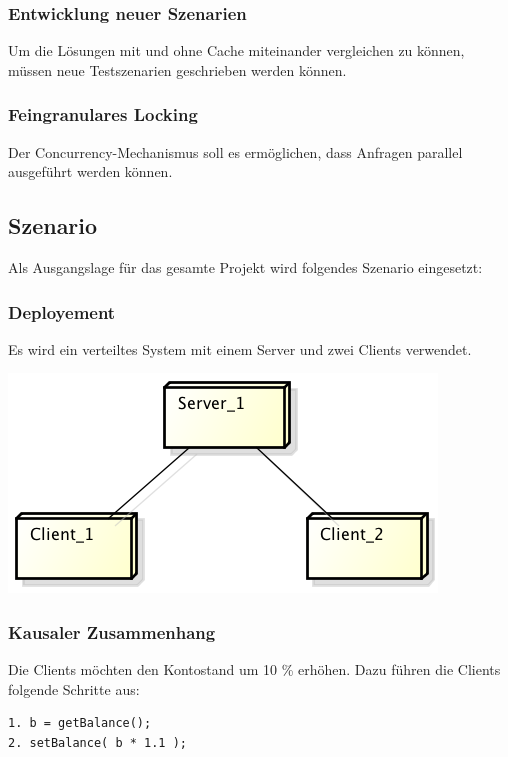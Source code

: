\documentclass{article}
\begin{document}
\subsubsection{Entwicklung neuer Szenarien}
\label{sec:entwicklung-neuer-szenarien}

Um die Lösungen mit und ohne Cache miteinander vergleichen zu können, müssen neue Testszenarien geschrieben werden können.

\subsubsection{Feingranulares Locking}
\label{sec:feingr-lock}

Der Concurrency-Mechanismus soll es ermöglichen, dass Anfragen parallel ausgeführt werden können.

\subsection{Szenario}
\label{sec:szenario}

Als Ausgangslage für das gesamte Projekt wird folgendes Szenario eingesetzt:

\subsubsection{Deployement}
\label{sec:deployement}

Es wird ein verteiltes System mit einem Server und zwei Clients verwendet.
\begin{center}
\includegraphics[scale=0.85]{Deployment.png}
\end{center}

\subsubsection{Kausaler Zusammenhang}
\label{sec:kaus-zusamm}

Die Clients möchten den Kontostand um 10 \% erhöhen. Dazu führen die Clients folgende Schritte aus:
\begin{lstlisting}
1. b = getBalance();
2. setBalance( b * 1.1 );
\end{lstlisting}
\end{document}
